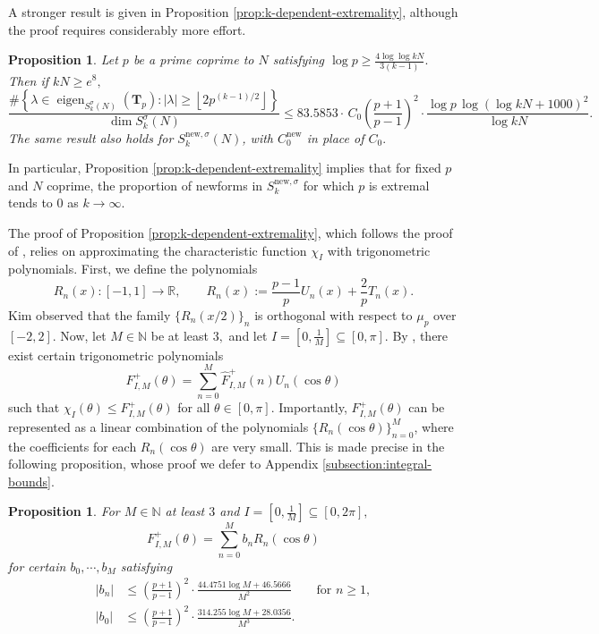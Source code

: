 \documentclass[11pt,letterpaper,reqno]{amsart}
\newtheorem{proposition}[theorem]{Proposition}
\theoremstyle{definition}
\numberwithin{equation}{section}
\numberwithin{figure}{section}
\numberwithin{table}{section}
\newcommand{\nw}{\mathrm{new}}
\begin{document}
A stronger result is given in Proposition \ref{prop:k-dependent-extremality}, although the proof requires considerably more effort.

{
\renewcommand{\thetheorem}{\ref{prop:k-dependent-extremality}}
\begin{proposition} 
    Let $p$ be a prime coprime to $N$ satisfying $\log p \geq \frac{4\log \log  kN}{3(k - 1)}.$ Then if $kN \geq e^8,$
    $$\frac{\#\left\{ \lambda \in \operatorname{eigen}_{ S_k^\sigma(N)} \! \left( \mathbf{T}_{p}  \right) :  |\lambda|  \geq \left\lfloor 2 p^{(k - 1)/2}  \right\rfloor \right\}}{\dim S_k^\sigma(N)} \leq 83.5853 \cdot \, C_0 \left( \frac{p + 1}{p - 1} \right)^2  \cdot \frac{ \log p \,  \log \left(  \log kN + 1000 \right)^2}{\log kN}.$$
    The same result also holds for $S_k^{\nw, \sigma}(N)$, with $C_0^\nw$ in place of $C_0.$
\end{proposition}
\addtocounter{theorem}{-1}
}

In particular, Proposition \ref{prop:k-dependent-extremality} implies that for fixed $p$ and $N$ coprime, the proportion of newforms in $S_k^{\nw, \sigma}$ for which $p$ is extremal tends to $0$ as $k \rightarrow \infty.$

The proof of Proposition \ref{prop:k-dependent-extremality}, which follows the proof of \cite[Theorem 2.4]{Kim24}, relies on approximating the characteristic function $\chi_I$ with trigonometric polynomials. First, we define the polynomials
\begin{equation}
    R_n(x) : [-1, 1] \rightarrow \mathbb{R}, \qquad R_n(x):= \frac{p - 1}{p} U_n(x) + \frac{2}{p} T_n(x). \label{eqn:definition-of-Rn(x)}
\end{equation}
Kim observed that the family $\{ R_n(x/2) \}_n$ is orthogonal with respect to $\mu_p$ over $[-2, 2]$. Now, let $M \in \mathbb{N}$ be at least $3,$ and let $I = \left[ 0, \frac{1}{M} \right] \subseteq \left[ 0, \pi \right].$ By \cite[Theorem 2.5]{Kim24}, there exist certain  trigonometric polynomials
$$F_{I, M}^+(\theta) = \sum_{n = 0}^M \widehat{F}_{I, M}^+(n) U_n(\cos \theta)$$
such that $\chi_I(\theta) \leq F_{I, M}^+(\theta)$ for all $\theta \in [0, \pi].$ Importantly, $F_{I, M}^+(\theta)$ can be represented as a linear combination of the polynomials $\{R_n(\cos \theta)\}_{n = 0}^M$, where the coefficients for each $R_n(\cos \theta)$ are very small. This is made precise in the following proposition, whose proof we defer to Appendix \ref{subsection:integral-bounds}.

\begin{proposition}\label{prop:kim-2-6-analog}
    For $M \in \mathbb{N}$ at least $3$ and $I = \left[0, \frac{1}{M} \right] \subseteq \left[0, 2\pi \right],$
    $$F_{I, M}^+(\theta) = \sum_{n = 0}^M b_n R_{n}(\cos \theta)$$
    for certain $b_0, \cdots, b_M$ satisfying
    \begin{align}
        |b_n| &\leq \left( \frac{p + 1}{p - 1} \right)^2 \cdot \frac{44.4751 \log M + 46.5666}{M^2} \qquad \text{for $n \geq 1$}, \\
        |b_0| &\leq \left( \frac{p + 1}{p - 1} \right)^2 \cdot \frac{314.255 \log M + 28.0356}{M^3}.
    \end{align}
\end{proposition}
\end{document}

